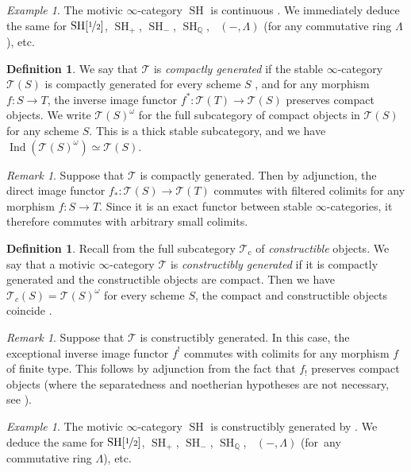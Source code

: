 \documentclass[JEP,XML,SOM,Unicode]{cedram}
\newcommand{\T}{\mathscr T}
\renewcommand{\AA}{\mathbb A}
\DeclareMathOperator{\SH}{SH}
\DeclareMathOperator{\DA}{D_{\AA^1}}
\DeclareMathOperator{\Ind}{Ind}
\newcommand{\ot} {{\nicefrac 1 2}}
\newcommand{\QQ} {\mathbb Q}
\theoremstyle{remark}
\newtheorem{rem}[thm]{Remark}
\newtheorem{ex}[thm]{Example}
\theoremstyle{definition}
\newtheorem{df}[thm]{Definition}
\numberwithin{equation}{thm}
\begin{document}
\begin{ex}\label{ex:continuous}
The motivic $\infty$-category $\SH$ is continuous \cite[Prop.\,C.12(4)]{HoyoisLefschetz}.
We immediately deduce the same for $\SH[\ot]$, $\SH_+$, $\SH_-$, $\SH_\QQ$, $\DA(-,\Lambda)$ (for any commutative ring $\Lambda$), etc.
\end{ex}

\begin{df}
We say that $\T$ is \emph{compactly generated} if the stable $\infty$-category $\T(S)$ is compactly generated for every scheme $S$ \cite[Def.\,5.5.7.1]{LurieHTT}, and for any morphism $f : S \to T$, the inverse image functor $f^* : \T(T) \to \T(S)$ preserves compact objects.
We write $\T(S)^\omega$ for the full subcategory of compact objects in $\T(S)$ for any scheme $S$.
This is a thick stable subcategory, and we have $\Ind(\T(S)^\omega) \simeq \T(S)$.
\end{df}

\begin{rem}\label{rem:f_* colimits}
Suppose that $\T$ is compactly generated.
Then by adjunction, the direct image functor $f_* : \T(S) \to \T(T)$ commutes with filtered colimits for any morphism $f : S \to T$.
Since it is an exact functor between stable $\infty$-categories, it therefore commutes with arbitrary small colimits.
\end{rem}

\begin{df}\label{df:constructibly generated}
Recall from \cite[Def.\,4.2.1]{CD3} the full subcategory $\T_{\mathrm{c}}$ of \emph{constructible} objects.
We say that a motivic $\infty$-category $\T$ is \emph{constructibly generated} if it is compactly generated and the constructible objects are compact.
Then we have $\T_c(S) = \T(S)^\omega$ for every scheme $S$, \ie the compact and constructible objects coincide \cite[Prop.\,1.4.11]{CD3}.
\end{df}

\begin{rem}\label{rem:f_! constructibles}
Suppose that $\T$ is constructibly generated.
In this case, the exceptional inverse image functor $f^!$ commutes with colimits for any morphism $f$ of finite type.
This follows by adjunction from the fact that $f_!$ preserves compact objects \cite[Cor.\,4.2.12]{CD3} (where the separatedness and noetherian hypotheses are not necessary, see \cite[Cor.\,2.62]{KhanSix}).
\end{rem}

\begin{ex}
The motivic $\infty$-category $\SH$ is constructibly generated by \cite[Prop.\,C.12(1-3)]{HoyoisLefschetz}.
We deduce the same for $\SH[\ot]$, $\SH_+$, $\SH_-$, $\SH_\QQ$, $\DA(-,\Lambda)$ (for~any commutative ring $\Lambda$), etc.
\end{ex}
\end{document}
